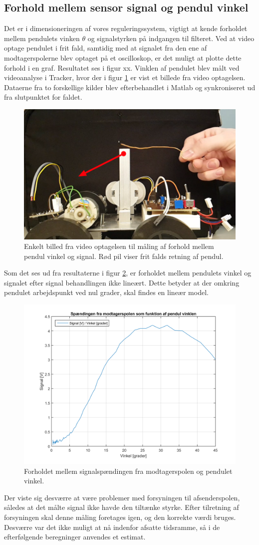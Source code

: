 \subsection{Forhold mellem sensor signal og pendul vinkel}
Det er i dimensioneringen af vores reguleringssystem, vigtigt at kende forholdet mellem pendulets vinken $\theta$ og signalstyrken på indgangen til filteret.
Ved at video optage pendulet i frit fald, samtidig med at signalet fra den ene af modtagerspolerne blev optaget på et oscilloskop, er det muligt at plotte dette forhold i en graf. Resultatet ses i figur xx.
Vinklen af pendulet blev målt ved videoanalyse i Tracker, hvor der i figur \ref{fig:pendul_fald_vid} er vist et billede fra video optagelsen.
Dataerne fra to forskellige kilder blev efterbehandlet i Matlab og synkroniseret ud fra slutpunktet for faldet.
\begin{figure}[h!]
	\centering
	\includegraphics[width=.6\textwidth]{billeder/pendul_fald_vid.png}
	\caption{Enkelt billed fra video optagelsen til måling af forhold mellem pendul vinkel og signal. Rød pil viser frit falds retning af pendul.}
	\label{fig:pendul_fald_vid}
\end{figure}
\FloatBlock
Som det ses ud fra resultaterne i figur \ref{fig:pendul_fald_res}, er forholdet mellem pendulets vinkel og signalet efter signal behandlingen ikke lineært.
Dette betyder at der omkring pendulet arbejdspunkt ved nul grader, skal findes en lineær model.  

\begin{figure}[h!]
	\centering
	\includegraphics[width=.7\textwidth]{billeder/pendul_fald_res.png}
	\caption{Forholdet mellem signalspændingen fra modtagerspolen og pendulet vinkel.}
	\label{fig:pendul_fald_res}
\end{figure}
\FloatBlock
Der viste sig desværre at være problemer med forsyningen til afsenderspolen, således at det målte signal ikke havde den tiltænke styrke.
Efter tilretning af forsyningen skal denne måling foretages igen, og den korrekte værdi bruges.
Desværre var det ikke muligt at nå indenfor afsatte tidsramme, så i de efterfølgende beregninger anvendes et estimat.

